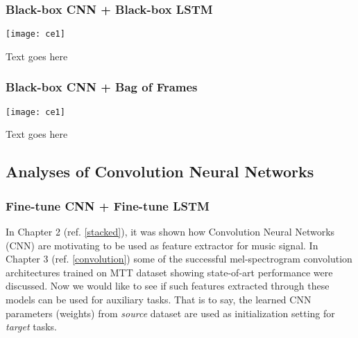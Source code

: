 \subsubsection{Black-box CNN + Black-box LSTM}
\begin{minipage}{0.15\textwidth}
\texttt{[image: ce1]}
\end{minipage}
\begin{minipage}{0.80\textwidth}
Text goes here
\end{minipage}

\subsubsection{Black-box CNN + Bag of Frames}
\begin{minipage}{0.15\textwidth}
\texttt{[image: ce1]}
\end{minipage}
\begin{minipage}{0.80\textwidth}
Text goes here
\end{minipage}

\subsection{Analyses of Convolution Neural Networks}
\label{pretrained}

\subsubsection{Fine-tune CNN + Fine-tune LSTM}


In Chapter 2 (ref. \ref{stacked}), it was shown how Convolution Neural Networks (CNN) are motivating to be used as feature extractor for music signal. In Chapter 3 (ref. \ref{convolution}) some of the successful mel-spectrogram convolution architectures trained on MTT dataset showing state-of-art performance were discussed. Now we would like to see if such features extracted through these models can be used for auxiliary tasks. That is to say, the learned CNN parameters (weights) from \textit{source} dataset are used as initialization setting for \textit{target} tasks.    
\bigskip

